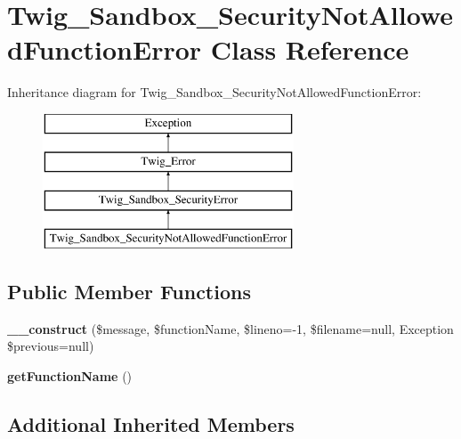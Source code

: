 \hypertarget{classTwig__Sandbox__SecurityNotAllowedFunctionError}{}\section{Twig\+\_\+\+Sandbox\+\_\+\+Security\+Not\+Allowed\+Function\+Error Class Reference}
\label{classTwig__Sandbox__SecurityNotAllowedFunctionError}
Inheritance diagram for Twig\+\_\+\+Sandbox\+\_\+\+Security\+Not\+Allowed\+Function\+Error\+:\begin{figure}[H]
\begin{center}
\leavevmode
\includegraphics[height=4.000000cm]{classTwig__Sandbox__SecurityNotAllowedFunctionError}
\end{center}
\end{figure}
\subsection*{Public Member Functions}
\begin{DoxyCompactItemize}
\item 
{\bfseries \+\_\+\+\_\+construct} (\$message, \$function\+Name, \$lineno=-\/1, \$filename=null, Exception \$previous=null)\hypertarget{classTwig__Sandbox__SecurityNotAllowedFunctionError_a8adb5ff0852f81dfe1d2444e4fe46b85}{}\label{classTwig__Sandbox__SecurityNotAllowedFunctionError_a8adb5ff0852f81dfe1d2444e4fe46b85}

\item 
{\bfseries get\+Function\+Name} ()\hypertarget{classTwig__Sandbox__SecurityNotAllowedFunctionError_ad1ba226e6288baea7450b8a611e932e4}{}\label{classTwig__Sandbox__SecurityNotAllowedFunctionError_ad1ba226e6288baea7450b8a611e932e4}

\end{DoxyCompactItemize}
\subsection*{Additional Inherited Members}


